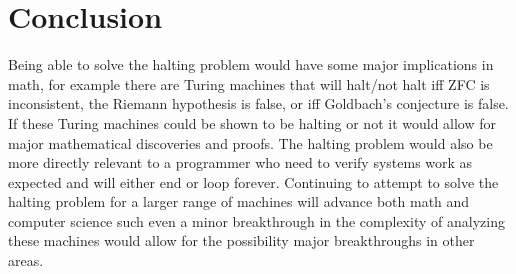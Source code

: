 \documentclass[journal,12pt,onecolumn,draftclsnofoot,]{IEEEtran}
\begin{document}
\section{Conclusion}

Being able to solve the halting problem would have some major implications in math, for 
example there are Turing machines that will halt/not halt iff ZFC is inconsistent, the 
Riemann hypothesis is false, or iff Goldbach's conjecture is false.\cite{1919}
If these Turing machines
could be shown to be halting or not it would allow for major mathematical discoveries and 
proofs. The halting problem would also be more directly relevant to a programmer who need to 
verify systems work as expected and will either end or loop forever. Continuing to attempt
to solve the halting problem for a larger range of machines will advance both math and 
computer science such even a minor breakthrough in the complexity of analyzing these 
machines would allow for the possibility major breakthroughs in other areas.



\end{document}
